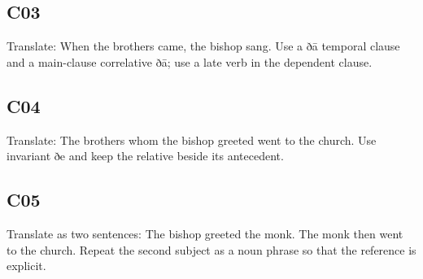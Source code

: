 \par\begin{minipage}{\linewidth}\raggedright
\subsection*{C03}

Translate: When the brothers came, the bishop sang. Use a ðā temporal clause and a main-clause correlative ðā; use a late verb in the dependent clause.

\end{minipage}\par\addvspace{4pt}

\par\begin{minipage}{\linewidth}\raggedright
\subsection*{C04}

Translate: The brothers whom the bishop greeted went to the church. Use invariant ðe and keep the relative beside its antecedent.

\end{minipage}\par\addvspace{4pt}

\par\begin{minipage}{\linewidth}\raggedright
\subsection*{C05}

Translate as two sentences: The bishop greeted the monk. The monk then went to the church. Repeat the second subject as a noun phrase so that the reference is explicit.

\end{minipage}\par\addvspace{4pt}

